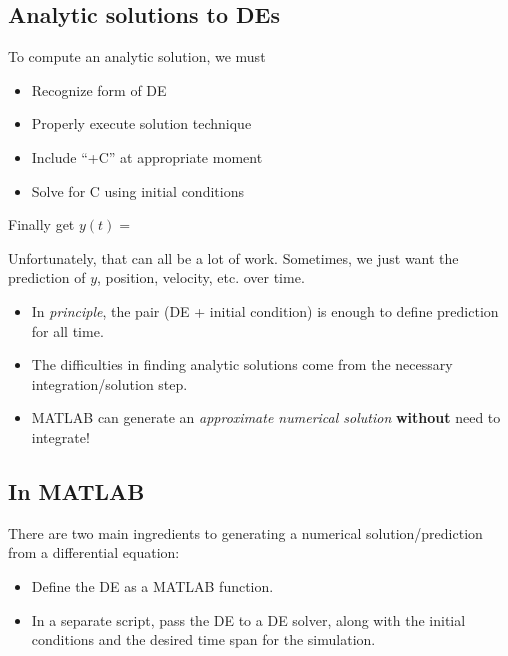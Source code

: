 
\newpage

\subsection*{Analytic solutions to DEs}
To compute an analytic solution, we must
\begin{itemize}
\item Recognize form of DE 
\vspace{0.5cm}
\item Properly execute solution technique
\vspace{0.5cm}
\item Include ``+C'' at appropriate moment
\vspace{0.5cm}
\item Solve for C using initial conditions
\end{itemize}
Finally get $y(t) = $

\vfill

\newpage

Unfortunately, that can all be a lot of work.  Sometimes, we just want
the prediction of $y$, position, velocity, etc. over time.
\begin{itemize}
\item In {\em principle}, the pair (DE + initial condition) is enough
  to define prediction for all time.
\item The difficulties in finding analytic solutions come from the
  necessary integration/solution step.
\item MATLAB can generate an {\em approximate numerical solution} {\bf
    without} need to integrate!
\end{itemize}

\vfill

\newpage

\subsection*{In MATLAB}
There are two main ingredients to generating a numerical solution/prediction 
from a differential equation:
\begin{itemize}
\item Define the DE as a MATLAB function.
\item In a separate script, pass the DE to a DE solver, along with the
  initial conditions and the desired time span for the simulation.
\end{itemize}

